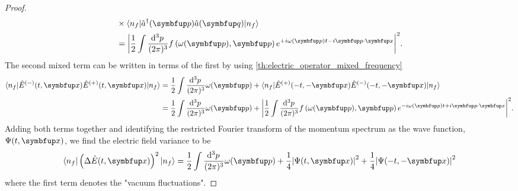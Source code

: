 \begin{proof}
\begin{equation}
\begin{split}
			&\times
			\bra{n_f}
			\hat{a}^\dagger(\vb{p})
			\hat{a}(\vb{q})
			\ket{n_f}
			\\
			&=
			\abs*{
				\frac{1}{2}
				\int\frac{\dd[3]{p}}{(2\pi)^3}
				f\left(\omega(\vb{p}),\vb{p}\right)
				e^{+i\omega(\vb{p})t-i\vb{p}\vdot\vb{x}}
			}^2
			.
		\end{split}
	\end{equation}
	The second mixed term can be written in terms of the first by using \cref{th:electric_operator_mixed_frequency}
	\begin{equation}
		\begin{split}
			\bra{n_f}
			\hat{E}^{(-)}(t,\vb{x})
			\hat{E}^{(+)}(t,\vb{x})
			\ket{n_f}
			&=
			\frac{1}{2}
			\int\frac{\dd[3]{p}}{(2\pi)^3}
			\omega(\vb{p})
			+
			\bra{n_f}
			\hat{E}^{(+)}(-t,-\vb{x})
			\hat{E}^{(-)}(-t,-\vb{x})
			\ket{n_f}
			\\
			&=
			\frac{1}{2}
			\int\frac{\dd[3]{p}}{(2\pi)^3}
			\omega(\vb{p})
			+
			\abs*{
				\frac{1}{2}
				\int\frac{\dd[3]{p}}{(2\pi)^3}
				f\left(\omega(\vb{p}),\vb{p}\right)
				e^{-i\omega(\vb{p})t+i\vb{p}\vdot\vb{x}}
			}^2
			.
		\end{split}
	\end{equation}
	Adding both terms together and identifying the restricted Fourier transform of the momentum spectrum as the wave function, $\Psi(t,\vb{x})$, we find the electric field variance to be
	\begin{equation}
		\bra{n_f}
		\left(
			\Delta
			\hat{E}(t,\vb{x})
		\right)^2
		\ket{n_f}
		=
		\frac{1}{2}
		\int\frac{\dd[3]{p}}{(2\pi)^3}
		\omega(\vb{p})
		+
		\frac{1}{4}
		\abs*{\Psi(t,\vb{x})}^2
		+
		\frac{1}{4}
		\abs*{\Psi(-t,-\vb{x})}^2
	\end{equation}
	where the first term denotes the "vacuum fluctuations".
\end{proof}

